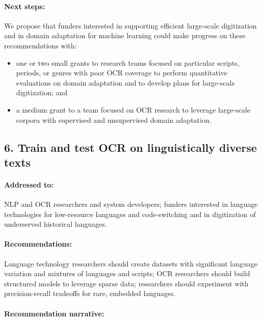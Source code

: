 \documentclass[twoside,11pt]{report}
\begin{document}
\paragraph{Next steps:} We propose that funders interested in supporting efficient large-scale digitization and in domain adaptation for machine learning could make progress on these recommendations with:
\begin{itemize}

\item one or two small grants to research teams focused on particular scripts, periods, or genres with poor OCR coverage to perform quantitative evaluations on domain adaptation and to develop plans for large-scale digitization; and

\item a medium grant to a team focused on OCR research to leverage large-scale corpora with supervised and unsupervised domain adaptation.

\end{itemize}

\subsection{6. Train and test OCR on linguistically diverse texts}
\label{sec:rec-diverse}

\paragraph{Addressed to:} NLP and OCR researchers and system developers; funders interested in language technologies for low-resource languages and code-switching and in digitization of underserved historical languages.

\paragraph{Recommendations:} Language technology researchers should create datasets with significant language variation and mixtures of languages and scripts; OCR researchers should build structured models to leverage sparse data; researchers should experiment with precision-recall tradeoffs for rare, embedded languages.

\paragraph{Recommendation narrative:}
\end{document}
